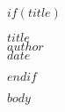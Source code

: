 \documentclass[11pt]{article}
\begin{document}
$if(title)$
\begin{center}
    {\Huge \textbf{$title$}}\\[1em]
    {\large $author$}\\[0.5em]
    {\small $date$}
\end{center}
\vspace{2em}
$endif$

$body$
\end{document}

